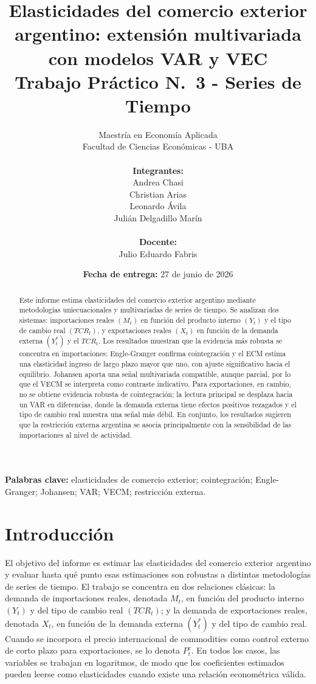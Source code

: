 \documentclass[11pt,a4paper]{article}
\title{%
	\textbf{Elasticidades del comercio exterior argentino: extensión multivariada con modelos VAR y VEC} \\
	\vspace{0.6em}
	\large Trabajo Práctico N.\textdegree~3 - Series de Tiempo
}
\author{
	Maestría en Economía Aplicada \\
	Facultad de Ciencias Económicas - UBA \\
	\\
	\textbf{Integrantes:} \\
	Andrea Chasi \\
	Christian Arias \\
	Leonardo Ávila \\
	Julián Delgadillo Marín \\
	\\
	\textbf{Docente:} \\
	Julio Eduardo Fabris
}
\date{\textbf{Fecha de entrega:} 27 de junio de 2026}
\begin{document}
	
	\maketitle
	
	\begin{abstract}
		Este informe estima elasticidades del comercio exterior argentino mediante
		metodologías uniecuacionales y multivariadas de series de tiempo. Se analizan
		dos sistemas: importaciones reales \((M_t)\) en función del producto interno
		\((Y_t)\) y el tipo de cambio real \((TCR_t)\), y exportaciones reales
		\((X_t)\) en función de la demanda externa \((Y_t^*)\) y el \(TCR_t\). Los
		resultados muestran que la evidencia más robusta se concentra en
		importaciones: Engle-Granger confirma cointegración y el ECM estima una
		elasticidad ingreso de largo plazo mayor que uno, con ajuste significativo
		hacia el equilibrio. Johansen aporta una señal multivariada compatible, aunque
		parcial, por lo que el VECM se interpreta como contraste indicativo. Para
		exportaciones, en cambio, no se obtiene evidencia robusta de cointegración; la
		lectura principal se desplaza hacia un VAR en diferencias, donde la demanda
		externa tiene efectos positivos rezagados y el tipo de cambio real muestra una
		señal más débil. En conjunto, los resultados sugieren que la restricción
		externa argentina se asocia principalmente con la sensibilidad de las
		importaciones al nivel de actividad.
	\end{abstract}
	
	\noindent\textbf{Palabras clave:} elasticidades de comercio exterior;
	cointegración; Engle-Granger; Johansen; VAR; VECM; restricción externa.
	
	\newpage
	
	\section{Introducción}
	\label{sec:introduccion}
	
	El objetivo del informe es estimar las elasticidades del comercio exterior
	argentino y evaluar hasta qué punto esas estimaciones son robustas a distintas
	metodologías de series de tiempo. El trabajo se concentra en dos relaciones
	clásicas: la demanda de importaciones reales, denotada \(M_t\), en función del
	producto interno \((Y_t)\) y del tipo de cambio real \((TCR_t)\); y la demanda
	de exportaciones reales, denotada \(X_t\), en función de la demanda externa
	\((Y_t^*)\) y del tipo de cambio real. Cuando se incorpora el precio
	internacional de commodities como control externo de corto plazo para
	exportaciones, se lo denota \(P_t^c\). En todos los casos, las variables se
	trabajan en logaritmos, de modo que los coeficientes estimados pueden leerse
	como elasticidades cuando existe una relación econométrica válida.
	
\end{document}
